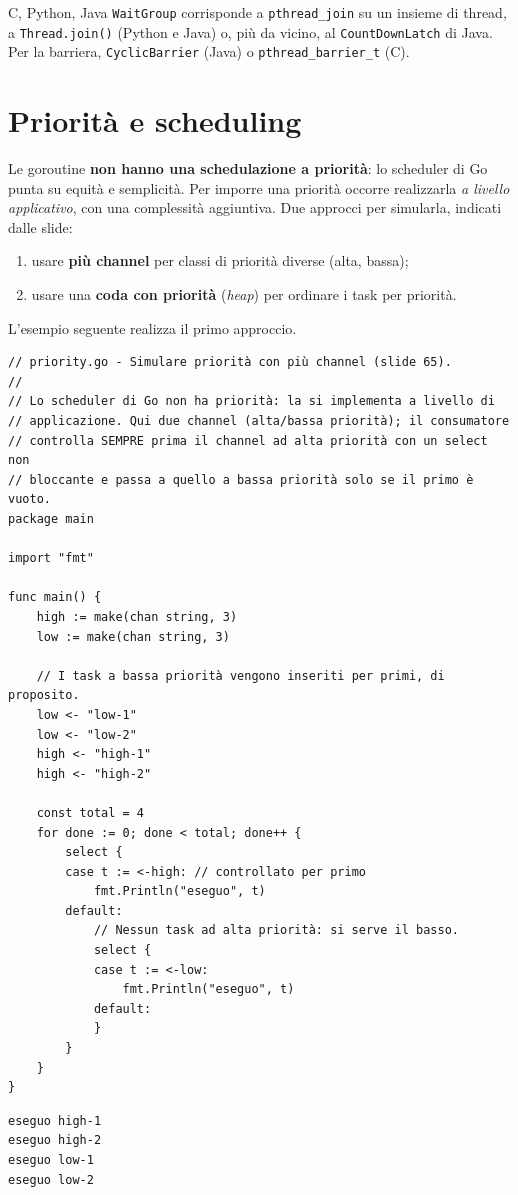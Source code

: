 \documentclass[11pt,a4paper]{report}
\newcommand{\cod}[1]{\texttt{#1}}
\begin{document}
\begin{confronto}{C, Python, Java}
\cod{WaitGroup} corrisponde a \cod{pthread\_join} su un insieme di thread, a
\cod{Thread.join()} (Python e Java) o, più da vicino, al
\cod{CountDownLatch} di Java. Per la barriera, \cod{CyclicBarrier} (Java) o
\cod{pthread\_barrier\_t} (C).
\end{confronto}

\section{Priorità e scheduling}\label{sec:priority}

Le goroutine \textbf{non hanno una schedulazione a priorità}: lo scheduler di Go
punta su equità e semplicità. Per imporre una priorità occorre realizzarla
\emph{a livello applicativo}, con una complessità aggiuntiva. Due approcci per
simularla, indicati dalle slide:

\begin{enumerate}
  \item usare \textbf{più channel} per classi di priorità diverse (alta,
        bassa);
  \item usare una \textbf{coda con priorità} (\emph{heap}) per ordinare i task
        per priorità.
\end{enumerate}

L'esempio seguente realizza il primo approccio.

\begin{lstlisting}[style=gocode,caption={\texttt{06\_concurrency/priority.go}}]
// priority.go - Simulare priorità con più channel (slide 65).
//
// Lo scheduler di Go non ha priorità: la si implementa a livello di
// applicazione. Qui due channel (alta/bassa priorità); il consumatore
// controlla SEMPRE prima il channel ad alta priorità con un select non
// bloccante e passa a quello a bassa priorità solo se il primo è vuoto.
package main

import "fmt"

func main() {
	high := make(chan string, 3)
	low := make(chan string, 3)

	// I task a bassa priorità vengono inseriti per primi, di proposito.
	low <- "low-1"
	low <- "low-2"
	high <- "high-1"
	high <- "high-2"

	const total = 4
	for done := 0; done < total; done++ {
		select {
		case t := <-high: // controllato per primo
			fmt.Println("eseguo", t)
		default:
			// Nessun task ad alta priorità: si serve il basso.
			select {
			case t := <-low:
				fmt.Println("eseguo", t)
			default:
			}
		}
	}
}
\end{lstlisting}
\begin{lstlisting}[style=output]
eseguo high-1
eseguo high-2
eseguo low-1
eseguo low-2
\end{lstlisting}
\end{document}
